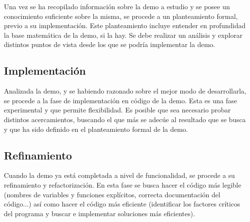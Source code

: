 Una vez se ha recopilado información sobre la demo a estudio y se posee un conocimiento suficiente sobre la misma, se procede a un planteamiento formal, previo a su implementación. Este planteamiento incluye entender en profundidad la base matemática de la demo, si la hay. Se debe realizar un análisis y explorar distintos puntos de vista desde los que se podría implementar la demo.

\subsection{Implementación}

Analizada la demo, y se habiendo razonado sobre el mejor modo de desarrollarla, se procede a la fase de implementación en código de la demo. Esta es una fase experimental y que permite flexibilidad. Es posible que sea necesario probar distintos acercamientos, buscando el que más se adecúe al resultado que se busca y que ha sido definido en el planteamiento formal de la demo.

\subsection{Refinamiento}

Cuando la demo ya está completada a nivel de funcionalidad, se procede a su refinamiento y refactorización. En esta fase se busca hacer el código más legible (nombres de variables y funciones explícitos, correcta documentación del código...) así como hacer el código más eficiente (identificar los factores críticos del programa y buscar e implementar soluciones más eficientes).